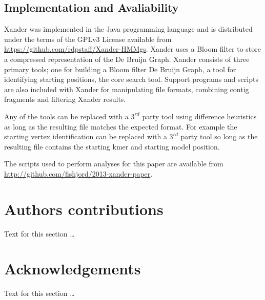 \documentclass[10pt]{bmc_article}
\newenvironment{bmcformat}{\begin{raggedright}\baselineskip20pt\sloppy\setboolean{publ}{false}}{\end{raggedright}\baselineskip20pt\sloppy}
\begin{document}
\begin{bmcformat}
\subsection*{Implementation and Avaliability}
Xander was implemented in the Java programming language and is distributed under the terms of the GPLv3 License available from \url{https://github.com/rdpstaff/Xander-HMMgs}.  Xander uses a Bloom filter to store a compressed representation of the De Bruijn Graph. Xander consists of three primary tools; one for building a Bloom filter De Bruijn Graph, a tool for identifying starting positions, the core search tool. Support programs and scripts are also included with Xander for manipulating file formats, combining contig fragments and filtering Xander results.

Any of the tools can be replaced with a $3^{rd}$ party tool using difference heuristics as long as the resulting file matches the expected format.  For example the starting vertex identification can be replaced with a $3^{rd}$ party tool so long as the resulting file contains the starting kmer and starting model position.

The scripts used to perform analyses for this paper are available from \url{http://github.com/fishjord/2013-xander-paper}.
    
\section*{Authors contributions}
    Text for this section \ldots

    

\section*{Acknowledgements}
  Text for this section \ldots


 



\end{bmcformat}
\end{document}
